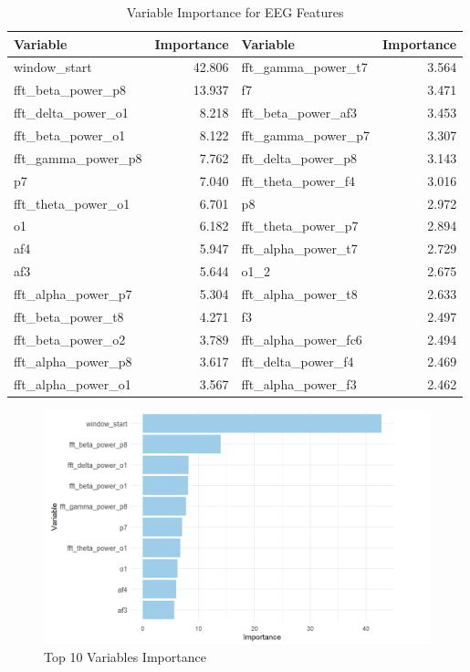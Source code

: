 \documentclass[
  doc]{apa6}
\begin{document}
\begin{table}[!h]
\centering
\caption{\label{tab:unnamed-chunk-4}Variable Importance for EEG Features}
\centering
\begin{tabular}[t]{l|r|l|r}
\hline
Variable & Importance & Variable & Importance\\
\hline
window\_start & 42.806 & fft\_gamma\_power\_t7 & 3.564\\
\hline
fft\_beta\_power\_p8 & 13.937 & f7 & 3.471\\
\hline
fft\_delta\_power\_o1 & 8.218 & fft\_beta\_power\_af3 & 3.453\\
\hline
fft\_beta\_power\_o1 & 8.122 & fft\_gamma\_power\_p7 & 3.307\\
\hline
fft\_gamma\_power\_p8 & 7.762 & fft\_delta\_power\_p8 & 3.143\\
\hline
p7 & 7.040 & fft\_theta\_power\_f4 & 3.016\\
\hline
fft\_theta\_power\_o1 & 6.701 & p8 & 2.972\\
\hline
o1 & 6.182 & fft\_theta\_power\_p7 & 2.894\\
\hline
af4 & 5.947 & fft\_alpha\_power\_t7 & 2.729\\
\hline
af3 & 5.644 & o1\_2 & 2.675\\
\hline
fft\_alpha\_power\_p7 & 5.304 & fft\_alpha\_power\_t8 & 2.633\\
\hline
fft\_beta\_power\_t8 & 4.271 & f3 & 2.497\\
\hline
fft\_beta\_power\_o2 & 3.789 & fft\_alpha\_power\_fc6 & 2.494\\
\hline
fft\_alpha\_power\_p8 & 3.617 & fft\_delta\_power\_f4 & 2.469\\
\hline
fft\_alpha\_power\_o1 & 3.567 & fft\_alpha\_power\_f3 & 2.462\\
\hline
\end{tabular}
\end{table}

\begin{figure}[H]

{\centering \includegraphics[width=0.8\linewidth]{figure/5} 

}

\caption{Top 10 Variables Importance}\label{fig:unnamed-chunk-5}
\end{figure}
\end{document}

